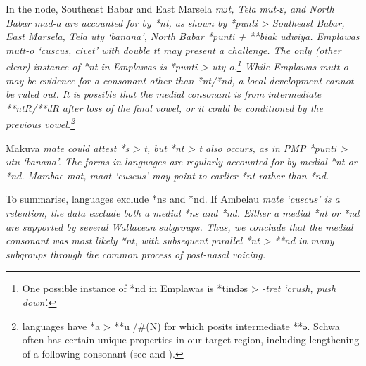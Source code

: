 In the  node, Southeast Babar and East Marsela \it{mɔt},
Tela \mbox{\it{mut-ɛ}}, and North Babar \it{mad-a} are accounted for by *nt,
as shown by *punti > Southeast Babar, East Marsela, Tela \it{uty} `banana',
North Babar *punti + **biak {\ra} \it{udwiya}.
Emplawas \it{mutt-o} ‘cuscus, civet’ with double \it{tt} may present a challenge.
The only (other clear) instance of *nt in Emplawas is *punti > \it{uty-o}.\footnote{
		One possible instance of *nd in Emplawas is
		*tindəs > \it{-tret} `crush, push down'.}
While Emplawas \it{mutt-o} may be evidence for a consonant other than *nt/*nd,
a local development cannot be ruled out.
It is possible that the medial consonant is from intermediate
**ntR/**dR after loss of the final vowel,
or it could be conditioned by the previous vowel.\footnote{
		 languages have *a > **u /{\#}(N){\gap} for which \citet{Zobel2018}
		posits intermediate **ə. Schwa often has certain unique properties in our target region,
		including lengthening of a following consonant (see  and ).}

Makuva \it{mate} could attest *s > \it{t},
but *nt > \it{t} also occurs,
as in PMP *punti > \it{utu} ‘banana’.
The forms in  languages are regularly accounted
for by medial *nt or *nd.
Mambae \it{mat, maat} ‘cuscus’ may point to earlier *nt rather than *nd.

To summarise,  languages exclude *ns and *nd.
If Ambelau \it{mate} ‘cuscus’ is a retention,
the  data exclude both a medial *ns and *nd.
Either a medial *nt or *nd are supported by several Wallacean subgroups.
Thus, we conclude that the medial consonant was most likely *nt,
with subsequent parallel *nt > **nd in many subgroups through
the common process of post-nasal voicing.

